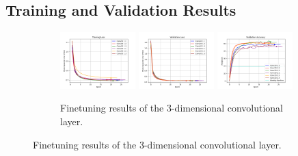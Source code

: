 \documentclass[./main.tex]{subfiles}
\begin{document}
\subsection{Training and Validation Results}
\label{subsec:finetune_train_val_res}
\begin{figure}[htbp]
    \centering
     \begin{subfigure}[b]{\textwidth}
         \centering
         \includegraphics[width=0.32\textwidth]{./entities/finetuned/baseline/train_losses.png}
         \includegraphics[width=0.32\textwidth]{./entities/finetuned/baseline/val_losses.png}
         \includegraphics[width=0.32\textwidth]{./entities/finetuned/baseline/val_accs.png}
         \caption{Finetuning results of the 3-dimensional convolutional layer.}
     \end{subfigure}
    \hfill


\end{figure}
\end{document}
